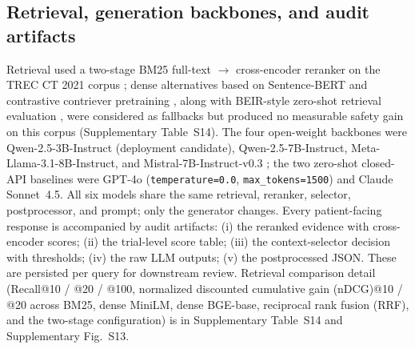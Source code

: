 \documentclass[11pt]{article}
\begin{document}
\subsection{Retrieval, generation backbones, and audit artifacts}
\label{sec:methods_misc}
Retrieval used a two-stage \textsc{BM25} full-text $\to$ cross-encoder reranker on the TREC CT 2021 corpus \citep{roberts2021trec,robertson2009bm25,nogueira2019passage,hofstatter2021crossenc,lin2021pyserini}; dense alternatives based on Sentence-BERT \citep{reimers2019sbert} and contrastive contriever pretraining \citep{izacard2022contriever}, along with BEIR-style zero-shot retrieval evaluation \citep{thakur2021beir}, were considered as fallbacks but produced no measurable safety gain on this corpus (Supplementary Table~S14). The four open-weight backbones were Qwen-2.5-3B-Instruct (deployment candidate), Qwen-2.5-7B-Instruct, Meta-Llama-3.1-8B-Instruct, and Mistral-7B-Instruct-v0.3 \citep{qwen25_2024,touvron2023llama2}; the two zero-shot closed-API baselines were GPT-4o (\texttt{temperature=0.0}, \texttt{max\_tokens=1500}) and Claude Sonnet~4.5. All six models share the same retrieval, reranker, selector, postprocessor, and prompt; only the generator changes. Every patient-facing response is accompanied by audit artifacts: (i) the reranked evidence with cross-encoder scores; (ii) the trial-level score table; (iii) the context-selector decision with thresholds; (iv) the raw LLM outputs; (v) the postprocessed JSON. These are persisted per query for downstream review. Retrieval comparison detail (Recall@10 / @20 / @100, normalized discounted cumulative gain (nDCG)@10 / @20 across BM25, dense MiniLM, dense BGE-base, reciprocal rank fusion (RRF), and the two-stage configuration) is in Supplementary Table~S14 and Supplementary Fig.~S13.

\sloppy
\end{document}
